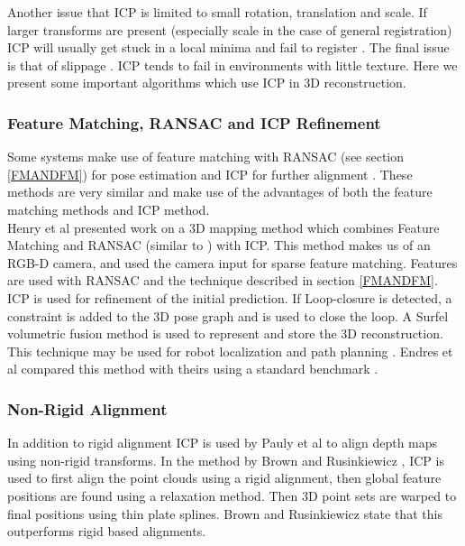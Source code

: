 Another issue that ICP is limited to small rotation, translation and scale. If larger transforms are present (especially scale in the case of general registration) ICP will usually get stuck in a local minima and fail to register \cite{Mitra04Registration}. The final issue is that of slippage \cite{Whelan13Robust}. ICP tends to fail in environments with little texture. Here we present some important algorithms which use ICP in 3D reconstruction.

\subsubsection{Feature Matching, RANSAC and ICP Refinement}

Some systems make use of feature matching with RANSAC (see section \ref{FMANDFM}) for pose estimation and ICP for further alignment \cite{Engelhard11Real, Henry10Rgb}. These methods are very similar and make use of the advantages of both the feature matching methods and ICP method. \\

Henry et al \cite{Henry10Rgb} presented work on a 3D mapping method which combines Feature Matching and RANSAC (similar to \cite{Endres12Evaluation}) with ICP. This method makes us of an RGB-D camera, and used the camera input for sparse feature matching. Features are used with RANSAC and the technique described in section \ref{FMANDFM}. ICP is used for refinement of the initial prediction. If Loop-closure is detected, a constraint is added to the 3D pose graph \cite{Kummerle11G} and is used to close the loop. A Surfel \cite{Pfister00Surfels} volumetric fusion method is used to represent and store the 3D reconstruction. This technique may be used for robot localization and path planning \cite{Hornung10Humanoid}. Endres et al \cite{Endres12Evaluation} compared this method with theirs using a standard benchmark \cite{Sturm12Benchmark}.  \\

\subsubsection{Non-Rigid Alignment}

In addition to rigid alignment ICP is used by Pauly et al \cite{Pauly05Example,Brown07Global} to align depth maps using non-rigid transforms. In the method by Brown and Rusinkiewicz \cite{Brown07Global}, ICP is used to first align the point clouds using a rigid alignment, then global feature positions are found using a relaxation method. Then 3D point sets are warped to final positions using thin plate splines. Brown and Rusinkiewicz state that this outperforms rigid based alignments.


